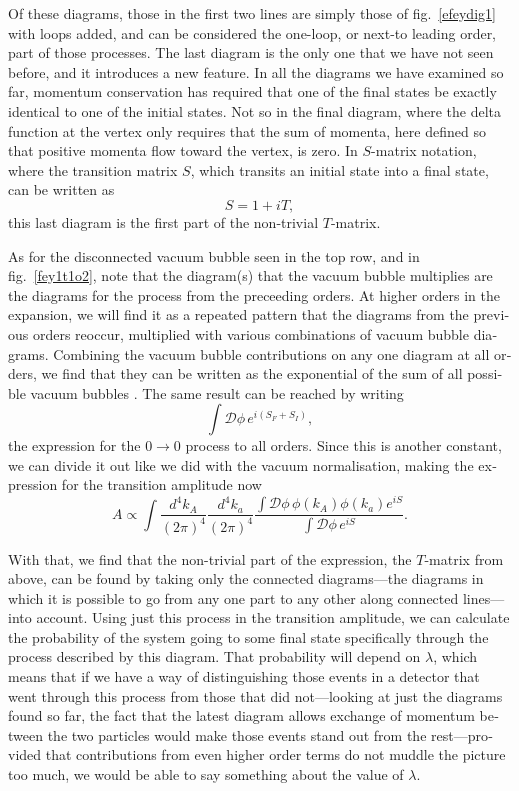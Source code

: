 \begin{english}
Of these diagrams, those in the first two lines are simply those of fig.~\ref{efeydig1} with loops added, and can be considered the one-loop, or next-to leading order, part of those processes.
 The last diagram is the only one that we have not seen before, and it introduces a new feature. In all the diagrams we have examined so far, momentum conservation has required that one of the final states be exactly identical to one of the initial states. Not so in the final diagram, where the delta function at the vertex only requires that the sum of momenta, here defined so that positive momenta flow toward the vertex, is zero. In $S$-matrix notation, where the transition matrix $S$, which transits an initial state into a final state, can be written as
\[S=1+iT,\]
this last diagram is the first part of the non-trivial $T$-matrix.

As for the disconnected vacuum bubble seen in the top row, and in fig.~\ref{fey1t1o2}, note that the diagram(s) that the vacuum bubble multiplies are the diagrams for the process from the preceeding orders. At higher orders in the expansion, we will find it as a repeated pattern that the diagrams from the previous orders reoccur, multiplied with various combinations of vacuum bubble diagrams. Combining the vacuum bubble contributions on any one diagram at all orders, we find that they can be written as the exponential of the sum of all possible vacuum bubbles \cite{sred:freediagexp}. The same result can be reached by writing
\[\int\mathcal D\phi\,e^{i(S_F+S_I)},\]
the expression for the $0\rightarrow0$ process to all orders. Since this is another constant, we can divide it out like we did with the vacuum normalisation, making the expression for the transition amplitude now
\[A\propto\int\frac{d^4k_A}{(2\pi)^4}\frac{d^4k_a}{(2\pi)^4}\frac{\int\mathcal D\phi\,\phi(k_A)\phi(k_a)e^{iS}}{\int\mathcal D\phi\,e^{iS}}.\]

With that, we find that the non-trivial part of the expression, the $T$-matrix from above, can be found by taking only the connected diagrams---the diagrams in which it is possible to go from any one part to any other along connected lines---into account. Using just this process in the transition amplitude, we can calculate the probability of the system going to some final state specifically through the process described by this diagram. That probability will depend on $\lambda$, which means that if we have a way of distinguishing those events in a detector that went through this process from those that did not---looking at just the diagrams found so far, the fact that the latest diagram allows exchange of momentum between the two particles would make those events stand out from the rest---provided that contributions from even higher order terms do not muddle the picture too much, we would be able to say something about the value of $\lambda$.


\end{english}
